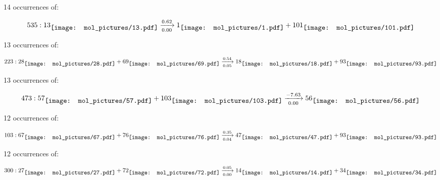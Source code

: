 \documentclass{article}
\begin{document}
\vspace{1cm}


14 occurrences of:

$$
535:  
13
\raisebox{-.5\height}{\texttt{[image: mol\_pictures/13.pdf]}}
\xrightarrow[0.00]{0.62}
1
\raisebox{-.5\height}{\texttt{[image: mol\_pictures/1.pdf]}}
+
101
\raisebox{-.5\height}{\texttt{[image: mol\_pictures/101.pdf]}}
$$



\vspace{1cm}


13 occurrences of:

$$
223:  
28
\raisebox{-.5\height}{\texttt{[image: mol\_pictures/28.pdf]}}
+
69
\raisebox{-.5\height}{\texttt{[image: mol\_pictures/69.pdf]}}
\xrightarrow[0.05]{0.54}
18
\raisebox{-.5\height}{\texttt{[image: mol\_pictures/18.pdf]}}
+
93
\raisebox{-.5\height}{\texttt{[image: mol\_pictures/93.pdf]}}
$$



\vspace{1cm}


13 occurrences of:

$$
473:  
57
\raisebox{-.5\height}{\texttt{[image: mol\_pictures/57.pdf]}}
+
103
\raisebox{-.5\height}{\texttt{[image: mol\_pictures/103.pdf]}}
\xrightarrow[0.00]{-7.63}
56
\raisebox{-.5\height}{\texttt{[image: mol\_pictures/56.pdf]}}
$$



\vspace{1cm}


12 occurrences of:

$$
103:  
67
\raisebox{-.5\height}{\texttt{[image: mol\_pictures/67.pdf]}}
+
76
\raisebox{-.5\height}{\texttt{[image: mol\_pictures/76.pdf]}}
\xrightarrow[0.04]{0.35}
47
\raisebox{-.5\height}{\texttt{[image: mol\_pictures/47.pdf]}}
+
93
\raisebox{-.5\height}{\texttt{[image: mol\_pictures/93.pdf]}}
$$



\vspace{1cm}


12 occurrences of:

$$
300:  
27
\raisebox{-.5\height}{\texttt{[image: mol\_pictures/27.pdf]}}
+
72
\raisebox{-.5\height}{\texttt{[image: mol\_pictures/72.pdf]}}
\xrightarrow[0.00]{0.05}
14
\raisebox{-.5\height}{\texttt{[image: mol\_pictures/14.pdf]}}
+
34
\raisebox{-.5\height}{\texttt{[image: mol\_pictures/34.pdf]}}
$$
\end{document}

